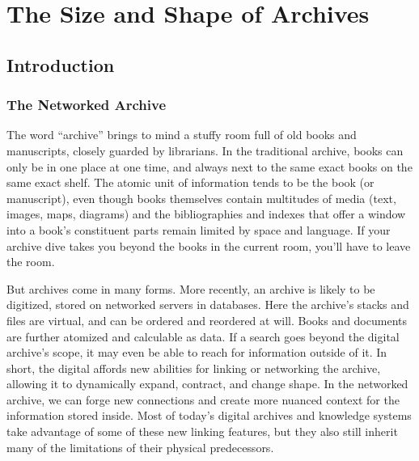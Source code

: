 \chapter{The Size and Shape of Archives}

\section{Introduction}

\subsection{The Networked Archive}

The word “archive” brings to mind a stuffy room full of old books and manuscripts, closely guarded by librarians. In the traditional archive, books can only be in one place at one time, and always next to the same exact books on the same exact shelf. The atomic unit of information tends to be the book (or manuscript), even though books themselves contain multitudes of media (text, images, maps, diagrams) and the bibliographies and indexes that offer a window into a book’s constituent parts remain limited by space and language. If your archive dive takes you beyond the books in the current room, you’ll have to leave the room.

But archives come in many forms. More recently, an archive is likely to be digitized, stored on networked servers in databases. Here the archive’s stacks and files are virtual, and can be ordered and reordered at will. Books and documents are further atomized and calculable as data. If a search goes beyond the digital archive’s scope, it may even be able to reach for information outside of it. In short, the digital affords new abilities for linking or networking the archive, allowing it to dynamically expand, contract, and change shape. In the networked archive, we can forge new connections and create more nuanced context for the information stored inside. Most of today’s digital archives and knowledge systems take advantage of some of these new linking features, but they also still inherit many of the limitations of their physical predecessors.

